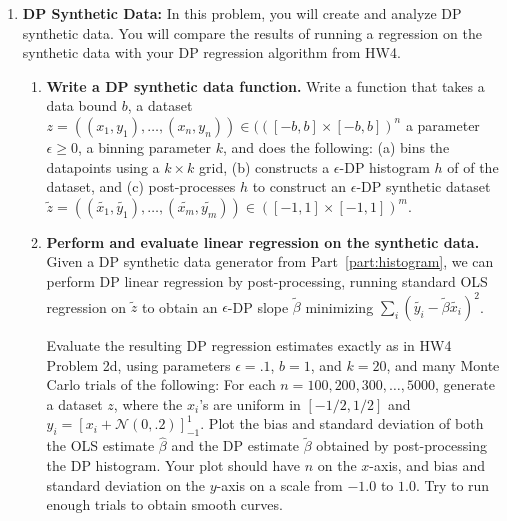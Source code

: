 \documentclass[11pt]{article}
\begin{document}
\begin{enumerate}[leftmargin=*]
		
		\item \textbf{DP Synthetic Data:}
		In this problem, you will create and analyze DP synthetic data. %
		You will compare the results of running a regression on the synthetic data with your DP regression algorithm from HW4.
		
		
		
		\begin{enumerate}
			\item \textbf{Write a DP synthetic data function.}
			Write a function that takes a data bound $b$, a dataset $z=((x_1,y_1),\ldots,(x_n,y_n))\in (([-b,b]\times [-b,b])^n$
			a parameter $\epsilon\geq 0$, a binning parameter $k$, and
			does the following:
			(a) bins the datapoints using a $k\times k$ grid, (b) constructs a $\epsilon$-DP histogram $h$ of of the dataset, and (c) post-processes $h$ to construct an $\epsilon$-DP synthetic dataset $\tilde{z} = ((\tilde{x_1},\tilde{y_1}),\ldots,(\tilde{x_m},\tilde{y_m}))
			\in ([-1,1]\times [-1,1])^m$.  
			\label{part:histogram}
		
			\item \textbf{Perform and evaluate linear regression on the synthetic data.} 
			Given a
			DP synthetic data generator from Part~\ref{part:histogram}, we can
			perform DP linear regression by post-processing, running
			standard OLS regression on $\tilde{z}$ to 
			obtain an $\epsilon$-DP slope $\tilde{\beta}$ minimizing 
			$\sum_i (\tilde{y_i}-\tilde{\beta}\tilde{x_i})^2$.
			\iffalse
	
			\fi
			Evaluate the resulting DP regression estimates exactly as in HW4                Problem 2d, using parameters $\epsilon=.1$, $b=1$, and $k=20$, and              many Monte Carlo trials of the following:
			For each $n=100,200,300,\ldots,5000$, 
			generate a dataset $z$, where the 
			$x_i$'s are uniform in $[-1/2,1/2]$ and 
			$y_i = \left[x_i + \mathcal{N}(0,.2)\right]_{-1}^{1}.$
			Plot the bias and standard deviation of both the OLS estimate $\hat{\beta}$ and the DP estimate $\tilde{\beta}$ obtained by
			post-processing the DP histogram.  
			Your plot should have $n$ on the $x$-axis, and bias and standard deviation on the $y$-axis on a scale from $-1.0$ to $1.0$.
			Try to run enough trials to obtain smooth curves.
			

\end{enumerate}
\end{enumerate}
\end{document}
